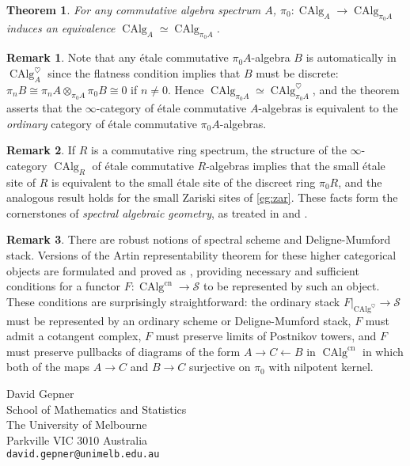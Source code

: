 \documentclass{article}
\newtheorem{theorem}{Theorem}[subsection]
\theoremstyle{definition}
\newtheorem{remark}{Remark}[subsection]
\renewcommand{\S}{\mathcal{S}}
\renewcommand{\i}{\infty}
\DeclareMathOperator{\et}{\acute{e}t}
\DeclareMathOperator{\CAlg}{CAlg}
\newcommand{\cn}{\mathrm{cn}}
\begin{document}
\begin{theorem}{\em \cite[Corollary 7.5.4.3]{HA}}\label{thm:et}
For any commutative algebra spectrum $A$, 
$
\pi_0 : \CAlg_A\to\CAlg_{\pi_0 A}
$
induces an equivalence  $\CAlg_A^{\et}\simeq\CAlg_{\pi_0 A}^{\et}$.
\end{theorem}



\begin{remark}
Note that any \'etale commutative $\pi_0 A$-algebra $B$ is automatically in $\CAlg_A^\heartsuit$ since the flatness condition implies that $B$ must be discrete: $\pi_n B\cong\pi_n A\otimes_{\pi_0 A}\pi_0 B\cong 0$ if $n\neq 0$.
Hence $\CAlg_{\pi_0 A}^{\et}\simeq\CAlg_{\pi_0 A}^{\heartsuit\et}$, and the theorem asserts that the $\infty$-category of \'etale commutative $A$-algebras is equivalent to the {\em ordinary} category of \'etale commutative $\pi_0 A$-algebras.
\end{remark}


\begin{remark}
If $R$ is a commutative ring spectrum, the structure of the $\i$-category $\CAlg_R^{\et}$ of \'etale commutative $R$-algebras implies that the small \'etale site of $R$ is equivalent to the small \'etale site of the discreet ring $\pi_0 R$, and the analogous result holds for the small Zariski sites of \autoref{eg:zar}.
These facts form the cornerstones of {\em spectral algebraic geometry}, as treated in \cite{SAG} and \cite{TV08}.
\end{remark}
\begin{remark}
There are robust notions of spectral scheme and Deligne-Mumford stack.
Versions of the Artin representability
theorem for these higher categorical objects are formulated and proved as \cite[Theorems 18.1.0.1 and 18.1.0.2]{SAG}, providing necessary and sufficient conditions for a functor $F:\CAlg^{\cn}\to\S$ to be represented by such an object.
These conditions are surprisingly straightforward: the ordinary stack $F|_{\CAlg^\heartsuit}\to\S$ must be represented by an ordinary scheme or Deligne-Mumford stack, $F$ must admit a cotangent complex, $F$ must preserve limits of Postnikov towers, and $F$ must preserve pullbacks of diagrams of the form $A\to C\leftarrow B$ in $\CAlg^{\cn}$ in which both of the maps $A\to C$ and $B\to C$ surjective on $\pi_0$ with nilpotent kernel.
\end{remark}


\printindex

{\small

}


\vspace{30pt}
\small
\noindent
David Gepner\\
School of Mathematics and Statistics\\
The University of Melbourne\\
Parkville VIC 3010 Australia\\
\texttt{david.gepner@unimelb.edu.au}
\end{document}
